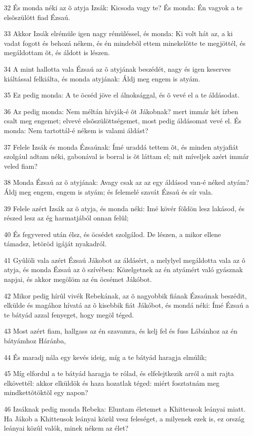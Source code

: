 \par 32 És monda néki az õ atyja Izsák: Kicsoda vagy te? És monda: Én vagyok a te elsõszülött fiad Ézsaú.
\par 33 Akkor Izsák elrémüle igen nagy rémüléssel, és monda: Ki volt hát az, a ki vadat fogott és behozá nékem, és én mindebõl ettem minekelõtte te megjöttél, és megáldottam õt, és áldott is lészen.
\par 34 A mint hallotta vala Ézsaú az õ atyjának beszédét, nagy és igen keserves kiáltással felkiálta, és monda atyjának: Áldj meg engem is atyám.
\par 35 Ez pedig monda: A te öcséd jöve el álnoksággal, és õ vevé el a te áldásodat.
\par 36 Az pedig monda: Nem méltán hívják-é õt Jákobnak? mert immár két ízben csalt meg engemet; elvevé elsõszülöttségemet, most pedig áldásomat vevé el. És monda: Nem tartottál-é nékem is valami áldást?
\par 37 Felele Izsák és monda Ézsaúnak: Ímé uraddá tettem õt, és minden atyjafiát szolgául adtam néki, gabonával is borral is õt láttam el; mit míveljek azért immár veled fiam?
\par 38 Monda Ézsaú az õ atyjának: Avagy csak az az egy áldásod van-é néked atyám? Áldj meg engem, engem is atyám; és felemelé szavát Ézsaú és sír vala.
\par 39 Felele azért Izsák az õ atyja, és monda néki: Imé kövér földön lesz lakásod, és részed lesz az ég harmatjából onnan felûl;
\par 40 És fegyvered után élsz, és öcsédet szolgálod. De lészen, a mikor ellene támadsz, letöröd igáját nyakadról.
\par 41 Gyûlöli vala azért Ézsaú Jákobot az áldásért, a melylyel megáldotta vala az õ atyja, és monda Ézsaú az õ szívében: Közelgetnek az én atyámért való gyásznak napjai, és akkor megölöm az én öcsémet Jákóbot.
\par 42 Mikor pedig hírûl vivék Rebekának, az õ nagyobbik fiának Ézsaúnak beszédit, elkülde és magához hívatá az õ kisebbik fiát Jákóbot, és mondá néki: Ímé Ézsaú a te bátyád azzal fenyeget, hogy megöl téged.
\par 43 Most azért fiam, hallgass az én szavamra, és kelj fel és fuss Lábánhoz az én bátyámhoz Háránba,
\par 44 És maradj nála egy kevés ideig, míg a te bátyád haragja elmúlik;
\par 45 Míg elfordul a te bátyád haragja te rólad, és elfelejtkezik arról a mit rajta elkövettél: akkor elküldök és haza hozatlak téged: miért fosztatnám meg mindkettõtöktõl egy napon?
\par 46 Izsáknak pedig monda Rebeka: Eluntam életemet a Khitteusok leányai miatt. Ha Jákob a Khitteusok leányai közûl vesz feleséget, a milyenek ezek is, ez ország leányai közûl valók, minek nékem az élet?

